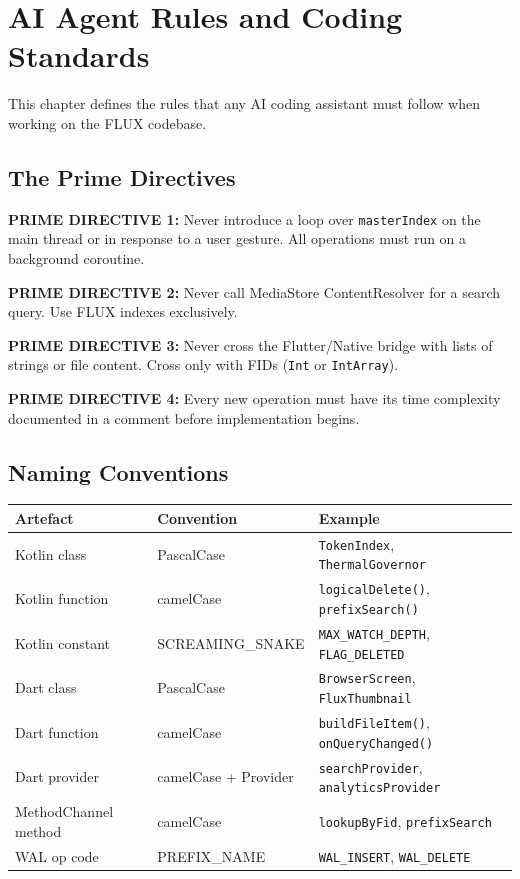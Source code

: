 \chapter{AI Agent Rules and Coding Standards}

This chapter defines the rules that any AI coding assistant must follow when working on the FLUX codebase.

\section{The Prime Directives}

\begin{warnbox}
\textbf{PRIME DIRECTIVE 1:} Never introduce a loop over \texttt{masterIndex} on the main thread or in response to a user gesture. All  operations must run on a background coroutine.

\textbf{PRIME DIRECTIVE 2:} Never call MediaStore ContentResolver for a search query. Use FLUX indexes exclusively.

\textbf{PRIME DIRECTIVE 3:} Never cross the Flutter/Native bridge with lists of strings or file content. Cross only with FIDs (\texttt{Int} or \texttt{IntArray}).

\textbf{PRIME DIRECTIVE 4:} Every new operation must have its time complexity documented in a comment before implementation begins.
\end{warnbox}

\section{Naming Conventions}

\begin{longtable}{@{}p{38mm}p{30mm}p{68mm}@{}}
\toprule
\textbf{Artefact} & \textbf{Convention} & \textbf{Example} \\
\midrule
Kotlin class & PascalCase & \texttt{TokenIndex}, \texttt{ThermalGovernor} \\
Kotlin function & camelCase & \texttt{logicalDelete()}, \texttt{prefixSearch()} \\
Kotlin constant & SCREAMING\_SNAKE & \texttt{MAX\_WATCH\_DEPTH}, \texttt{FLAG\_DELETED} \\
Dart class & PascalCase & \texttt{BrowserScreen}, \texttt{FluxThumbnail} \\
Dart function & camelCase & \texttt{buildFileItem()}, \texttt{onQueryChanged()} \\
Dart provider & camelCase + Provider & \texttt{searchProvider}, \texttt{analyticsProvider} \\
MethodChannel method & camelCase & \texttt{lookupByFid}, \texttt{prefixSearch} \\
WAL op code & PREFIX\_NAME & \texttt{WAL\_INSERT}, \texttt{WAL\_DELETE} \\
\bottomrule
\end{longtable}

